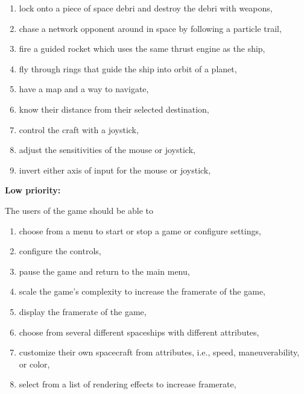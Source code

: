 \begin{multicols}{2}
\begin{enumerate}

  \item lock onto a piece of space debri and destroy the debri with weapons,

  \item chase a network opponent around in space by following a particle trail,

  \item fire a guided rocket which uses the same thrust engine as the ship,

  \item fly through rings that guide the ship into orbit of a planet,

  \item have a map and a way to navigate,

  \item know their distance from their selected destination,

  \item control the craft with a joystick,

  \item adjust the sensitivities of the mouse or joystick,

  \item invert either axis of input for the mouse or joystick,

\end{enumerate}
\end{multicols}

\noindent \textbf{Low priority:}

The users of the game should be able to

\begin{multicols}{2}
\begin{enumerate}

  \item choose from a menu to start or stop a game or configure settings,

  \item configure the controls,

  \item pause the game and return to the main menu,

  \item scale the game's complexity to increase the framerate of the game,

  \item display the framerate of the game,

  \item choose from several different spaceships with different attributes,

  \item customize their own spacecraft from attributes, i.e., speed, maneuverability, or color,

  \item select from a list of rendering effects to increase framerate,

\end{enumerate}
\end{multicols}

